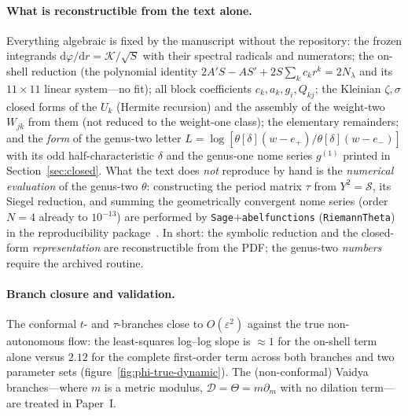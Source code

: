 \documentclass[12pt]{iopart}
\theoremstyle{plain}
\theoremstyle{definition}
\theoremstyle{remark}
\newcommand{\dd}{\mathrm{d}}
\begin{document}
\paragraph{What is reconstructible from the text alone.} Everything algebraic is fixed
by the manuscript without the repository: the frozen integrands
$\dd\varphi/\dd r=\mathcal K/\sqrt S$ with their spectral radicals and numerators;
the on-shell reduction (the polynomial identity $2A'S-AS'+2S\sum_k c_kr^k=2N_\lambda$
and its $11\times11$ linear system---no fit); all block coefficients $c_k,a_k,g_i,Q_{kj}$;
the Kleinian $\zeta,\sigma$ closed forms of the $U_k$ (Hermite recursion) and the assembly
of the weight-two $W_{jk}$ from them (not reduced to the weight-one class); the elementary
remainders; and the \emph{form} of the genus-two letter
$L=\log[\theta[\delta](w-e_+)/\theta[\delta](w-e_-)]$ with its odd half-characteristic
$\delta$ and the genus-one nome series $g^{(1)}$ printed in
Section~\ref{sec:closed}. What the text does \emph{not} reproduce by hand is the
\emph{numerical evaluation} of the genus-two $\theta$: constructing the period matrix
$\tau$ from $Y^2=\mathcal S$, its Siegel reduction, and summing the geometrically
convergent nome series (order $N{=}4$ already to $10^{-13}$) are performed by
\texttt{Sage}$+$\texttt{abelfunctions} (\texttt{RiemannTheta}) in the reproducibility
package~\cite{Rosignoli2026Code}. In short: the symbolic reduction and the closed-form
\emph{representation} are reconstructible from the PDF; the genus-two \emph{numbers}
require the archived routine.

\paragraph{Branch closure and validation.} The conformal $t$- and $\tau$-branches close
to $O(\varepsilon^2)$ against the true non-autonomous flow: the least-squares log--log
slope is $\approx1$ for the on-shell term alone versus $2.12$ for the complete first-order
term across both branches and two parameter sets (figure~\ref{fig:phi-true-dynamic}). The
(non-conformal) Vaidya branches---where $m$ is a metric modulus, $\mathcal D=\Theta=
m\partial_m$ with no dilation term---are treated in Paper~I.
\end{document}
